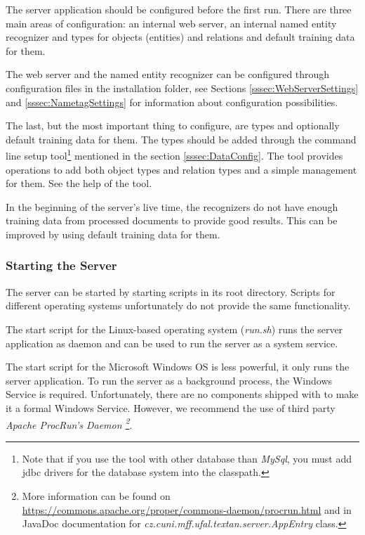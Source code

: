 The \textan{} server application should be configured before the first run. There
are three main areas of configuration: an internal web server, an internal named
entity recognizer and types for objects (entities) and relations and default training
data for them.

The web server and the named entity recognizer can be configured through configuration
files in the installation folder, see Sections \ref{sssec:WebServerSettings} and
\ref{sssec:NametagSettings} for information about configuration possibilities.

The last, but the most important thing to configure, are types and optionally
default training data for them. The types should be added through the command
line setup tool\footnote{Note that if you use the tool with other database than
\emph{MySql}, you must add jdbc drivers for the database system into the classpath.}
mentioned in the section \ref{sssec:DataConfig}. The tool provides operations to
add both object types and relation types and a simple management for them. See
the help of the tool.

In the beginning of the server's live time, the recognizers do not have enough
training data from processed documents to provide good results. This can be
improved by using default training data for them.

\subsubsection{Starting the Server}

The server can be started by starting scripts in its root directory. Scripts for
different operating systems unfortunately do not provide the same functionality.

The start script for the Linux-based operating system (\emph{run.sh}) runs the
server application as daemon and can be used to run the server as a system service.

The start script for the Microsoft Windows OS is less powerful, it only runs the
server application. To run the server as a background process, the Windows
Service is required. Unfortunately, there are no components shipped with
\textan{} to make it a formal Windows Service. However, we recommend the use of
third party \emph{Apache Proc\-Run's Daemon \footnote{More information can be
found on \url{https://commons.apache.org/proper/commons-daemon/procrun.html}
and in JavaDoc documentation for \emph{cz.\-cuni.\-mff.\-ufal.\-textan.\-server.\-AppEntry}
class.}}.

